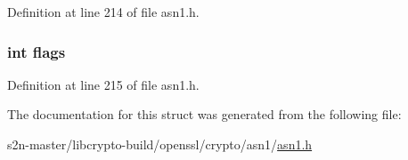 Definition at line 214 of file asn1.\+h.

\subsubsection[{\texorpdfstring{flags}{flags}}]{\setlength{\rightskip}{0pt plus 5cm}int flags}\hypertarget{structasn1__object__st_ac8bf36fe0577cba66bccda3a6f7e80a4}{}\label{structasn1__object__st_ac8bf36fe0577cba66bccda3a6f7e80a4}


Definition at line 215 of file asn1.\+h.



The documentation for this struct was generated from the following file\+:\begin{DoxyCompactItemize}
\item 
s2n-\/master/libcrypto-\/build/openssl/crypto/asn1/\hyperlink{crypto_2asn1_2asn1_8h}{asn1.\+h}\end{DoxyCompactItemize}
